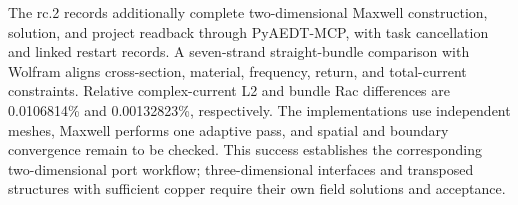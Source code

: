 \hypertarget{09.ansys.rc2}{}
The rc.2 records additionally complete two-dimensional Maxwell construction, solution, and project readback through PyAEDT-MCP, with task cancellation and linked restart records. A seven-strand straight-bundle comparison with Wolfram aligns cross-section, material, frequency, return, and total-current constraints. Relative complex-current L2 and bundle Rac differences are 0.0106814\% and 0.00132823\%, respectively. The implementations use independent meshes, Maxwell performs one adaptive pass, and spatial and boundary convergence remain to be checked. This success establishes the corresponding two-dimensional port workflow; three-dimensional interfaces and transposed structures with sufficient copper require their own field solutions and acceptance. \cite{PYAEDTMCP,PYAEDT}
